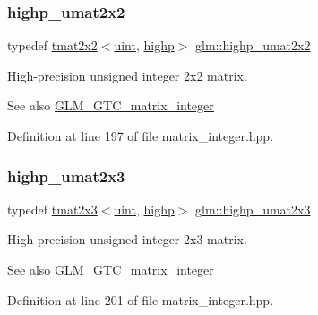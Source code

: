 \subsubsection{\texorpdfstring{highp\_umat2x2}{highp\_umat2x2}}
{\footnotesize\ttfamily typedef \mbox{\hyperlink{structglm_1_1tmat2x2}{tmat2x2}}$<$\mbox{\hyperlink{group__core__precision_ga4fd29415871152bfb5abd588334147c8}{uint}}, \mbox{\hyperlink{namespaceglm_a0f04f086094c747d227af4425893f545ac6f7eab42eacbb10d59a58e95e362074}{highp}}$>$ \mbox{\hyperlink{group__gtc__matrix__integer_gaeb546847abfc7c3c09ea8172987ebb16}{glm\+::highp\+\_\+umat2x2}}}

High-\/precision unsigned integer 2x2 matrix. \begin{DoxySeeAlso}{See also}
\mbox{\hyperlink{group__gtc__matrix__integer}{G\+L\+M\+\_\+\+G\+T\+C\+\_\+matrix\+\_\+integer}} 
\end{DoxySeeAlso}


Definition at line 197 of file matrix\+\_\+integer.\+hpp.

\mbox{\label{group__gtc__matrix__integer_gab058a0a12ea7f604d92baeb7a0e54f3b}} 
\subsubsection{\texorpdfstring{highp\_umat2x3}{highp\_umat2x3}}
{\footnotesize\ttfamily typedef \mbox{\hyperlink{structglm_1_1tmat2x3}{tmat2x3}}$<$\mbox{\hyperlink{group__core__precision_ga4fd29415871152bfb5abd588334147c8}{uint}}, \mbox{\hyperlink{namespaceglm_a0f04f086094c747d227af4425893f545ac6f7eab42eacbb10d59a58e95e362074}{highp}}$>$ \mbox{\hyperlink{group__gtc__matrix__integer_gab058a0a12ea7f604d92baeb7a0e54f3b}{glm\+::highp\+\_\+umat2x3}}}

High-\/precision unsigned integer 2x3 matrix. \begin{DoxySeeAlso}{See also}
\mbox{\hyperlink{group__gtc__matrix__integer}{G\+L\+M\+\_\+\+G\+T\+C\+\_\+matrix\+\_\+integer}} 
\end{DoxySeeAlso}


Definition at line 201 of file matrix\+\_\+integer.\+hpp.

\mbox{\label{group__gtc__matrix__integer_gafcec07e857ea0445d93680411e86482c}} 
